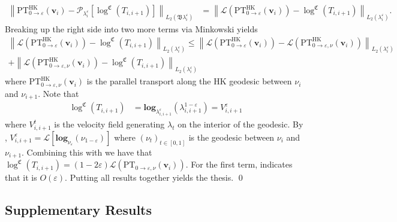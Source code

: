 \documentclass[11pt]{article}
\begin{document}
\begin{align*}
    \left\|\text{PT}^{\text{HK}}_{0 \rightarrow \varepsilon}(\mathbf{v}_i) - \mathcal{P}_{\lambda_{i}^\varepsilon}[\log^{\mathfrak{C}}(T_{i, i + 1})] \right\|_{L_2(\mathfrak{B}\lambda_i^{\varepsilon})} &= \left\|\mathcal{L}(\text{PT}^{\text{HK}}_{0 \rightarrow \varepsilon}(\mathbf{v}_i)) - \log^{\mathfrak{C}}(T_{i, i + 1}) \right\|_{L_2(\lambda_i^{\varepsilon})}.
\end{align*}
Breaking up the right side into two more terms via Minkowski yields
\begin{multline} \label{velocity approximation error}
    \left\|\mathcal{L}(\text{PT}^{\text{HK}}_{0 \rightarrow \varepsilon}(\mathbf{v}_i)) - \log^{\mathfrak{C}}(T_{i, i + 1}) \right\|_{L_2(\lambda_i^{\varepsilon})} \leq \left\|\mathcal{L}(\text{PT}^{\text{HK}}_{0 \rightarrow \varepsilon}(\mathbf{v}_i)) - \mathcal{L}(\text{PT}^{\text{HK}}_{0\rightarrow \varepsilon, \nu}(\mathbf{v}_i)) \right\|_{L_2(\lambda_i^{\varepsilon})} \\
    + \left\|\mathcal{L}(\text{PT}^{\text{HK}}_{0\rightarrow \varepsilon, \nu}(\mathbf{v}_i)) - \log^{\mathfrak{C}}(T_{i, i + 1}) \right\|_{L_2(\lambda_i^{\varepsilon})}
\end{multline}
where $\text{PT}^{\text{HK}}_{0\rightarrow \varepsilon, \nu}(\mathbf{v}_i)$ is the parallel transport along the HK geodesic between $\nu_i$ and $\nu_{i + 1}$. Note that 
\begin{align*}
    \log^{\mathfrak{C}}(T_{i, i+1}) &= \mathbf{log}_{\lambda_{i, i+1}^{\varepsilon}}(\lambda_{i, i+1}^{1-\varepsilon}) = V_{i, i+1}^\varepsilon
\end{align*}
where $V_{i, i+1}^t$ is the velocity field generating $\lambda_t$ on the interior of the geodesic. By , $V_{i, i+1}^\varepsilon = \mathcal{L}[\mathbf{log}_{\nu_{\varepsilon}}(\nu_{1-\varepsilon})]$ where $(\nu_t)_{t\in[0,1]}$ is the geodesic between $\nu_i$ and $\nu_{i+1}$.  Combining this with  we have that $\log^{\mathfrak{C}}(T_{i, i + 1}) = (1 - 2\varepsilon)\mathcal{L}(\text{PT}_{0 \rightarrow\varepsilon, \nu}(\mathbf{v}_i))$. For the first term,  indicates that it is $O(\varepsilon)$. Putting all results together yields the thesis. \qed{}

\subsection{Supplementary Results}
\end{document}
